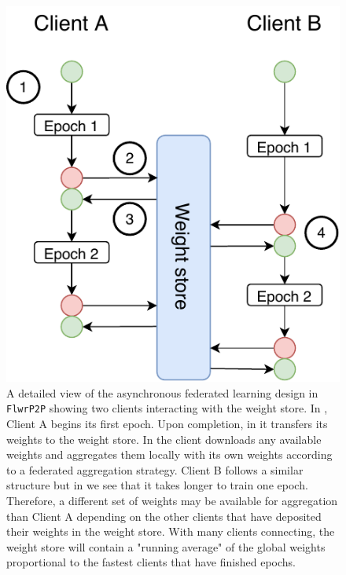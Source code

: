 \documentclass[twocolumn, switch]{article} %
\begin{document}
\begin{figure}
    \centering
    \includegraphics{graphics/flower_async_detail.pdf}
    \caption{A detailed view of the asynchronous federated learning design in \texttt{FlwrP2P} showing two clients interacting with the weight store. In , Client A begins its first epoch. Upon completion, in  it transfers its weights to the weight store. In  the client downloads any available weights and aggregates them locally with its own weights according to a federated aggregation strategy. Client B follows a similar structure but in  we see that it takes longer to train one epoch. Therefore, a different set of weights may be available for aggregation than Client A depending on the other clients that have deposited their weights in the weight store. With many clients connecting, the weight store will contain a "running average" of the global weights proportional to the fastest clients that have finished epochs.}
    \label{fig:async-detail}
\end{figure}
\end{document}
